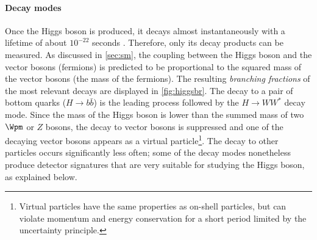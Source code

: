 \paragraph{Decay modes}
Once the Higgs boson is produced, it decays almost instantaneously with a lifetime of about $10^{-22}$ seconds \cite{PDG2020}.
Therefore, only its decay products can be measured.
As discussed in \cref{sec:sm}, the coupling between the Higgs boson and the vector bosons (fermions) is predicted to be proportional to the squared mass of the vector bosons (the mass of the fermions). The resulting \emph{branching fractions} of the most relevant decays are displayed in \cref{fig:higgsbr}. 
The decay to a pair of bottom quarks ($H\rightarrow b\bar{b}$) is the leading process followed by the $H\rightarrow WW^*$ decay mode. Since the mass of the Higgs boson is lower than the summed mass of two $\Wpm$ or $Z$ bosons, the decay to vector bosons is suppressed and one of the decaying vector bosons appears as a virtual particle\footnote{Virtual particles have the same properties as on-shell particles, but can violate momentum and energy conservation for a short period limited by the uncertainty principle.}. The decay to other particles occurs significantly less often; some of the decay modes nonetheless produce detector signatures that are very suitable for studying the Higgs boson, as explained below.

